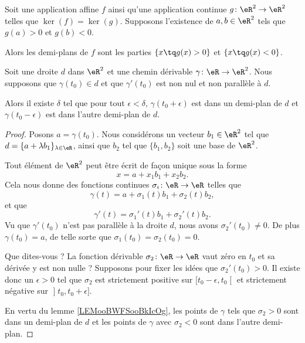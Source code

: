 \begin{lemma}       \label{LEMooURPNooYRsuaI}
    Soit une application affine \( f\) ainsi qu'une application continue \( g\colon \eR^2\to \eR^2\) telles que \( \ker(f)=\ker(g)\). Supposons l'existence de \( a,b\in \eR^2\) tels que \( g(a)>0\) et \( g(b)<0\).

    Alors les demi-plans de \( f\) sont les parties \( \{ x\tq g(x)>0 \}\) et \( \{ x\tq g(x)<0 \}\).
\end{lemma}

\begin{proposition}     \label{PROPooTPHKooXnpJaV}
    Soit une droite \( d\) dans \( \eR^2\) et une chemin dérivable \( \gamma\colon \eR\to \eR^2\). Nous supposons que \( \gamma(t_0)\in d\) et que \( \gamma'(t_0)\) est non nul et non parallèle à \( d\).

    Alors il existe \( \delta\) tel que pour tout \( \epsilon<\delta\), \( \gamma(t_0+\epsilon)\) est dans un demi-plan de \( d\) et \( \gamma(t_0-\epsilon)\) est dans l'autre demi-plan de \( d\).
\end{proposition}

\begin{proof}
    Posons \( a=\gamma(t_0)\). Nous considérons un vecteur \( b_1\in \eR^2\) tel que \( d=\{ a+\lambda b_1 \}_{\lambda\in \eR}\), ainsi que \( b_2\) tel que \( \{ b_1,b_2 \}\) soit une base de \( \eR^2\).

    Tout élément de \( \eR^2\) peut être écrit de façon unique sous la forme
    \begin{equation}
        x=a+x_1b_1+x_2b_2.
    \end{equation}
    Cela nous donne des fonctions continues \( \sigma_i\colon \eR\to \eR\) telles que
    \begin{equation}
        \gamma(t)=a+\sigma_1(t)b_1+\sigma_2(t)b_2,
    \end{equation}
    et que
    \begin{equation}
        \gamma'(t)=\sigma_1'(t)b_1+\sigma_2'(t)b_2.
    \end{equation}
    Vu que \( \gamma'(t_0)\) n'est pas parallèle à la droite \( d\), nous avons \( \sigma_2'(t_0)\neq 0\). De plus \( \gamma(t_0)=a\), de telle sorte que \( \sigma_1(t_0)=\sigma_2(t_0)=0\).

    Que dites-vous ? La fonction dérivable \( \sigma_2\colon \eR\to \eR\) vaut zéro en \( t_0\) et sa dérivée y est non nulle ? Supposons pour fixer les idées que \( \sigma_2'(t_0)>0\). Il existe donc un \( \epsilon>0\) tel que \( \sigma_2\) est strictement positive sur \( \mathopen[ t_0-\epsilon , t_0 \mathclose[\) et strictement négative sur \( \mathopen] t_0 , t_0+\epsilon \mathclose]\). 

    En vertu du lemme \ref{LEMooBWFSooBkIcOg}, les points de \( \gamma\) tels que \( \sigma_2>0\) sont dans un demi-plan de \( d\) et les points de \( \gamma\) avec \( \sigma_2<0\) sont dans l'autre demi-plan.
\end{proof}


